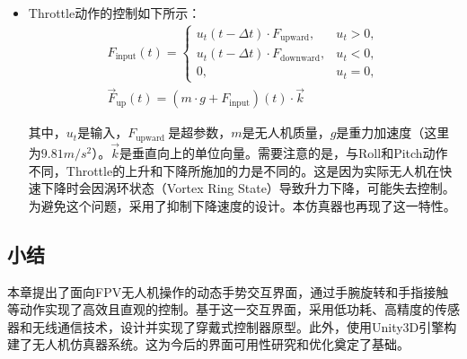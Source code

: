 \begin{itemize}
    \item Throttle动作的控制如下所示：
          \begin{equation}
              \begin{aligned}
                  F_{\text{input}}(t) =
                  \begin{cases}
                      u_t(t-\Delta t) \cdot F_{\text{upward}},   & u_t > 0, \\
                      u_t(t-\Delta t) \cdot F_{\text{downward}}, & u_t < 0, \\
                      0,                                         & u_t = 0,
                  \end{cases} \\
                  \Vec{F}_{\text{up}}(t) = (m \cdot g + F_{\text{input}})(t) \cdot \Vec{k}
              \end{aligned}
          \end{equation}

          其中，$u_t$是输入，$F_{\text {upward }}$是超参数，$m$是无人机质量，$g$是重力加速度（这里为$9.81 m/s^2$）。$\Vec{k}$是垂直向上的单位向量。需要注意的是，与Roll和Pitch动作不同，Throttle的上升和下降所施加的力是不同的。这是因为实际无人机在快速下降时会因涡环状态（Vortex Ring State）导致升力下降，可能失去控制。为避免这个问题，采用了抑制下降速度的设计。本仿真器也再现了这一特性。

\end{itemize}

\subsection{小结}
本章提出了面向FPV无人机操作的动态手势交互界面，通过手腕旋转和手指接触等动作实现了高效且直观的控制。基于这一交互界面，采用低功耗、高精度的传感器和无线通信技术，设计并实现了穿戴式控制器原型。此外，使用Unity3D引擎构建了无人机仿真器系统。这为今后的界面可用性研究和优化奠定了基础。

\clearpage
\ifx\allfiles\undefined

\fi
